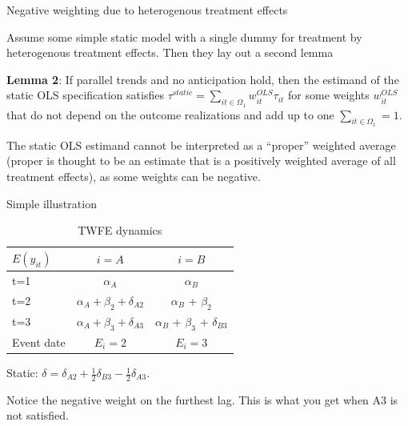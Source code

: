 \documentclass{beamer}
\begin{document}
\begin{frame}{Negative weighting due to heterogenous treatment effects}

Assume some simple static model with a single dummy for treatment by heterogenous treatment effects.  Then they lay out a second lemma

\bigskip 
\textbf{Lemma 2}: If parallel trends and no anticipation hold, then the estimand of the static OLS specification satisfies $\tau^{static}=\sum_{it \in \Omega_1} w_{it}^{OLS}\tau_{it}$ for some weights $w_{it}^{OLS}$ that do not depend on the outcome realizations and add up to one $\sum_{it \in \Omega_1}=1$.

\bigskip

The static OLS estimand cannot be interpreted as a ``proper'' weighted average (proper is thought to be an estimate that is a positively weighted average of all treatment effects), as some weights can be negative. 

\end{frame}


\begin{frame}{Simple illustration}


\begin{table}[htb]\centering
\scriptsize
\caption{TWFE dynamics}
\centering
\begin{threeparttable}
\begin{tabular}{l*{2}{c}}
\toprule
\multicolumn{1}{l}{$E(y_{it})$ }&
\multicolumn{1}{c}{\textbf{$i=A$ }}&
\multicolumn{1}{c}{\textbf{$i=B$ }}\\
\midrule
t=1 & $\alpha_A$ & $\alpha_B$ \\
t=2 & $\alpha_A + \beta_2 + \delta_{A2}$ & $\alpha_B$ + $\beta_2$ \\
t=3 & $\alpha_A + \beta_3 + \delta_{A3}$ & $\alpha_B$ + $\beta_3$ + $\delta_{B3}$ \\
\midrule
Event date & $E_i=2$ & $E_i = 3$ \\
\bottomrule
\end{tabular}
\end{threeparttable}
\end{table}

Static: $\delta = \delta_{A2} + \frac{1}{2}\delta_{B3} - \frac{1}{2} \delta_{A3}$.  \\

\bigskip

Notice the negative weight on the furthest lag. This is what you get when A3 is not satisfied.

\end{frame}
\end{document}
